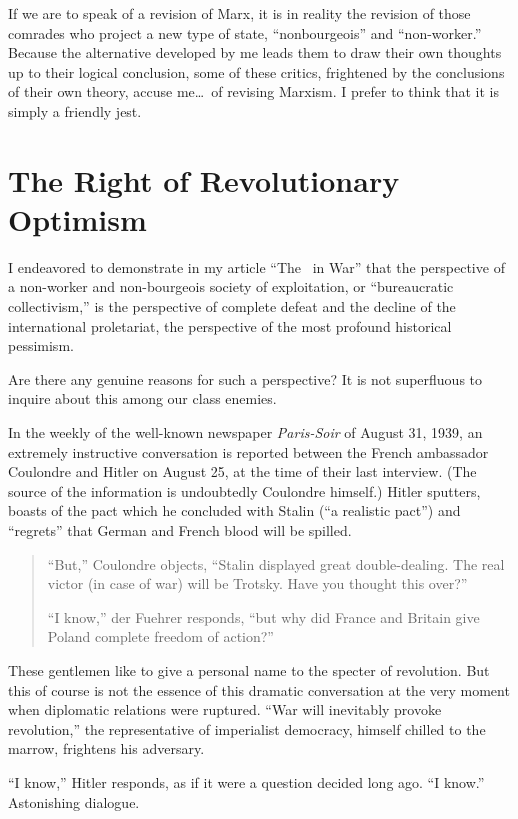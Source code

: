 If we are to speak of a revision of Marx, it is in reality the revision of those comrades who project a new type of state, “nonbourgeois” and “non-worker.” Because the alternative developed by me leads them to draw their own thoughts up to their logical conclusion, some of these critics, frightened by the conclusions of their own theory, accuse me\dots\ of revising Marxism. I prefer to think that it is simply a friendly jest.

\section*{The Right of Revolutionary Optimism}

I endeavored to demonstrate in my article ``The \USSR\ in War'' that the perspective of a non-worker and non-bourgeois society of exploitation, or “bureaucratic collectivism,” is the perspective of complete defeat and the decline of the international proletariat, the perspective of the most profound historical pessimism.

Are there any genuine reasons for such a perspective? It is not superfluous to inquire about this among our class enemies.

In the weekly of the well-known newspaper \emph{Paris-Soir} of August 31, 1939, an extremely instructive conversation is reported between the French ambassador Coulondre and Hitler on August 25, at the time of their last interview. (The source of the information is undoubtedly Coulondre himself.) Hitler sputters, boasts of the pact which he concluded with Stalin (“a realistic pact”) and “regrets” that German and French blood will be spilled.

\begin{quote}
  “But,” Coulondre objects, “Stalin displayed great double-dealing. The real victor (in case of war) will be Trotsky. Have you thought this over?”
  
  “I know,” der Fuehrer responds, “but why did France and Britain give Poland complete freedom of action?”
\end{quote}

These gentlemen like to give a personal name to the specter of revolution. But this of course is not the essence of this dramatic conversation at the very moment when diplomatic relations were ruptured. “War will inevitably provoke revolution,” the representative of imperialist democracy, himself chilled to the marrow, frightens his adversary.

“I know,” Hitler responds, as if it were a question decided long ago. “I know.” Astonishing dialogue.

